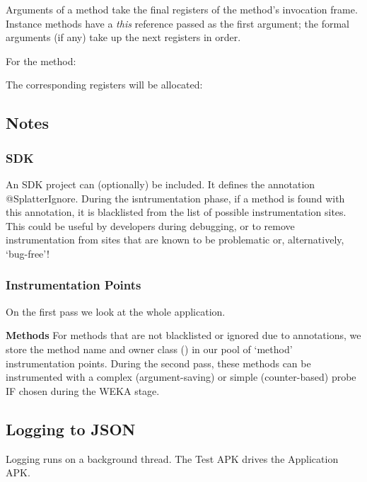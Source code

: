 Arguments of a method take the final registers of the method's invocation frame. Instance methods have a \textit{this} reference passed as the first argument; the formal arguments (if any) take up the next registers in order.

For the method:


The corresponding registers will be allocated:



\subsection{Notes}

\subsubsection{SDK}

An SDK project can (optionally) be included. It defines the annotation @SplatterIgnore. During the isntrumentation phase, if a method is found with this annotation, it is blacklisted from the list of possible instrumentation sites. This could be useful by developers during debugging, or to remove instrumentation from sites that are known to be problematic or, alternatively, {\lq}bug-free{\rq}!

\subsubsection{Instrumentation Points}
On the first pass we look at the whole application.

\textbf{Methods}
For methods that are not blacklisted or ignored due to annotations, we store the method name and owner class () in our pool of {\lq}method{\rq} instrumentation points. During the second pass, these methods can be instrumented with a complex (argument-saving) or simple (counter-based) probe IF chosen during the WEKA stage.

\subsection{Logging to JSON}

Logging runs on a background thread. The Test APK drives the Application APK.

